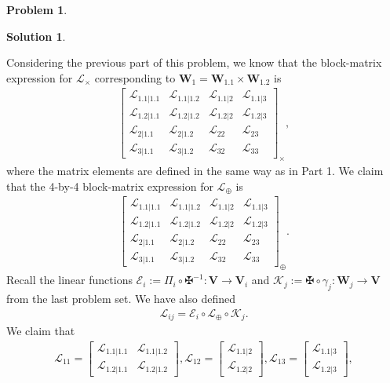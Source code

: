 \documentclass{article}
\theoremstyle{definition}
\newtheorem*{prob*}{Problem}
\newtheorem*{sln*}{Solution}
\newcommand{\V}{\mathbf{V}}
\newcommand{\W}{\mathbf{W}}
\newcommand{\lag}{\mathcal{L}}
\newcommand{\K}{\mathcal{K}}
\newcommand{\E}{\mathcal{E}}
\begin{document}
\begin{prob*}
\begin{sln*}
\begin{enumerate}
		
		Considering the previous part of this problem, we know that the block-matrix expression for $\lag_{\times}$ corresponding to $\W_{1} = \W_{1.1}\times \W_{1.2}$ is
		\begin{align*}
		\begin{bmatrix}
		\lag_{1.1|1.1} & \lag_{1.1|1.2} & \lag_{1.1|2} & \lag_{1.1|3}\\
		\lag_{1.2|1.1} & \lag_{1.2|1.2} & \lag_{1.2|2} & \lag_{1.2|3}\\
		\lag_{2|1.1} & \lag_{2|1.2} & \lag_{22} & \lag_{23}\\
		\lag_{3|1.1} & \lag_{3|1.2} & \lag_{32} & \lag_{33}
		\end{bmatrix}_\times,
		\end{align*}
		where the matrix elements are defined in the same way as in Part 1. We claim that the 4-by-4 block-matrix expression for $\lag_{\oplus}$ is
		\begin{align*}
		\begin{bmatrix}
		\lag_{1.1|1.1} & \lag_{1.1|1.2} & \lag_{1.1|2} & \lag_{1.1|3}\\
		\lag_{1.2|1.1} & \lag_{1.2|1.2} & \lag_{1.2|2} & \lag_{1.2|3}\\
		\lag_{2|1.1} & \lag_{2|1.2} & \lag_{22} & \lag_{23}\\
		\lag_{3|1.1} & \lag_{3|1.2} & \lag_{32} & \lag_{33}
		\end{bmatrix}_\oplus.
		\end{align*}
		Recall the linear functions $\E_i := \Pi_i \circ \maltese^{-1} : \V \to \V_i$ and $\K_j := \maltese\circ \gamma_j : \W_j \to \V$ from the last problem set. We have also defined
		\begin{align*}
		\lag_{ij} = \E_i \circ \lag_\oplus \circ \K_j.
		\end{align*}	
		We claim that 
		\begin{align*}
		\lag_{11} = \begin{bmatrix}
		\lag_{1.1|1.1} & \lag_{1.1|1.2}\\
		\lag_{1.2|1.1} & \lag_{1.2|1.2}
		\end{bmatrix}, \lag_{12} = \begin{bmatrix}
		\lag_{1.1|2}\\ \lag_{1.2|2}
		\end{bmatrix}, \lag_{13} = \begin{bmatrix}
		\lag_{1.1|3}\\\lag_{1.2|3}
		\end{bmatrix},
		\end{align*}
		\begin{align*}

\end{align*}
\end{enumerate}
\end{sln*}
\end{prob*}
\end{document}
